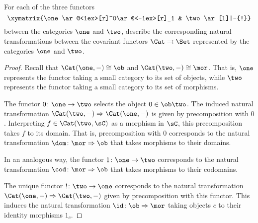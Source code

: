 \documentclass[../../main]{subfiles}
\begin{document}
\paragraph{}
\begin{exercise}
For each of the three functors
\[
\xymatrix{\one\ar@<1ex>[r]^0\ar@<-1ex>[r]_1 & \two\ar[l]|-{!}}
\]
between the categories $\one$ and $\two$, describe the corresponding natural transformations between the covariant functors $\Cat\rightrightarrows\Set$ represented by the categories $\one$ and $\two$.
\end{exercise}

\begin{proof}
Recall that $\Cat(\one,-)\cong\ob$ and $\Cat(\two,-)\cong\mor$. That is, $\one$ represents the functor taking a small category to its set of objects, while $\two$ represents the functor taking a small category to its set of morphisms.

The functor $0\colon\one\rightarrow\two$ selects the object $0\in\ob\two$. The induced natural transformation $\Cat(\two,-)\Rightarrow\Cat(\one,-)$ is given by precomposition with $0$. Interpreting $f\in\Cat(\two,\sC)$ as a morphism in $\sC$, this precomposition takes $f$ to its domain. That is, precomposition with $0$ corresponds to the natural transformation $\dom\colon\mor\Rightarrow\ob$ that takes morphisms to their domains.

In an analogous way, the functor $1\colon\one\rightarrow\two$ corresponds to the natural transformation $\cod\colon\mor\Rightarrow\ob$ that takes morphisms to their codomains. 

The unique functor $!\colon\two\rightarrow\one$ corresponds to the natural transformation $\Cat(\one,-)\Rightarrow\Cat(\two,-)$ given by precomposition with this functor. This induces the natural transformation $\id\colon\ob\Rightarrow\mor$ taking objects $c$ to their identity morphisms $1_c$.

\end{proof}
\end{document}
